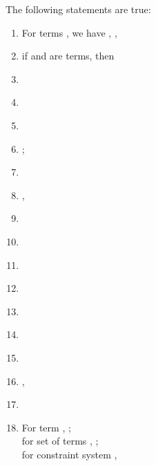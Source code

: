 \begin{lemma}\label{lemma:normprop}
	The following statements are true:
	\begin{enumerate}
\item	\label{pACI}         For terms , we have , , 
\item 	\label{pNormNorm}      if  and  are terms, then  

		\item	\label{pSubNorm}     	



		\item	\label{pSubNormHasProimage}           	



		\item \label{pNormElems}        
		
		\item \label{pNormDotNorm}        ; 



		\item \label{pDotNormElems}         \\  


		\item \label{pAhList}, \item \label{pAhNorm}                     

		\item \label{pPahNorm}                
		\item \label{pPairingOfPairing}          
\item \label{pSubSubSub}                       
		\item \label{pNormSub}	
 		\item	\label{pSepVar}
		\item	\label{pSepVarII}          

		\item	\label{pNormCard}       ,  \item	\label{pSizesComparision}         
\item	\label{pNormSize}              For term , ; \\ for set of terms , ; \\
			for constraint system , 


\end{enumerate}
\end{lemma}
